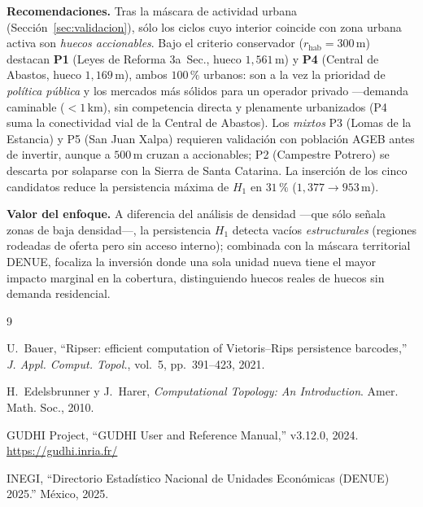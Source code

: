 \documentclass[twocolumn, 10pt]{article}
\begin{document}
\noindent\textbf{Recomendaciones.}
Tras la máscara de actividad urbana (Sección~\ref{sec:validacion}),
sólo los ciclos cuyo interior coincide con zona urbana activa son
\emph{huecos accionables}.
Bajo el criterio conservador ($r_{\text{hab}}=300$\,m) destacan
\textbf{P1} (Leyes de Reforma 3a~Sec., hueco $1{,}561$\,m) y
\textbf{P4} (Central de Abastos, hueco $1{,}169$\,m), ambos $100\,\%$
urbanos: son a la vez la prioridad de \emph{política pública} y los
mercados más sólidos para un operador privado —demanda caminable
($<1$\,km), sin competencia directa y plenamente urbanizados (P4
suma la conectividad vial de la Central de Abastos).
Los \emph{mixtos} P3 (Lomas de la Estancia) y P5 (San Juan Xalpa)
requieren validación con población AGEB antes de invertir, aunque a
$500$\,m cruzan a accionables; P2 (Campestre Potrero) se descarta
por solaparse con la Sierra de Santa Catarina.
La inserción de los cinco candidatos reduce la persistencia máxima
de $H_1$ en $31\,\%$ ($1{,}377\to953$\,m).

\noindent\textbf{Valor del enfoque.}
A diferencia del análisis de densidad —que sólo señala zonas de baja
densidad—, la persistencia $H_1$ detecta vacíos \emph{estructurales}
(regiones rodeadas de oferta pero sin acceso interno); combinada con
la máscara territorial DENUE, focaliza la inversión donde una sola
unidad nueva tiene el mayor impacto marginal en la cobertura,
distinguiendo huecos reales de huecos sin demanda residencial.

\begin{thebibliography}{9}

U.~Bauer, ``Ripser: efficient computation of Vietoris--Rips
persistence barcodes,'' \emph{J. Appl. Comput. Topol.}, vol.~5,
pp.~391--423, 2021.

H.~Edelsbrunner y J.~Harer, \emph{Computational Topology: An
Introduction}. Amer. Math. Soc., 2010.

GUDHI Project, ``GUDHI User and Reference Manual,'' v3.12.0, 2024.
\url{https://gudhi.inria.fr/}

INEGI, ``Directorio Estadístico Nacional de Unidades Económicas
(DENUE) 2025.'' México, 2025.

\end{thebibliography}
\end{document}
